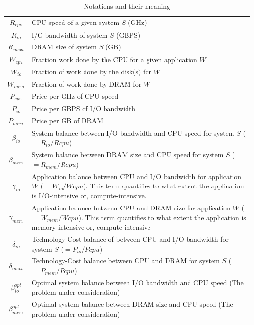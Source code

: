 \documentclass[journal]{IEEEtran}
\begin{document}
\begin{table}[!t]
\caption{Notations and their meaning}
\label{tab:Notation}
\centering
\begin{tabular}{|c|p{7cm}|}
\hline
$R_{cpu}$ & CPU speed of a given system $S$ (GHz)\\
$R_{io}$ &  I/O bandwidth of system $S$ (GBPS)\\
$R_{mem}$ & DRAM size of system $S$ (GB)\\
\hline
$W_{cpu}$ & Fraction work done by the CPU for a given application $W$\\
$W_{io}$ & Fraction of work done by the disk(s) for $W$\\
$W_{mem}$ & Fraction of work done by DRAM for $W$\\
\hline
$P_{cpu}$ & Price per GHz of CPU speed\\
$P_{io}$ & Price per GBPS of I/O bandwidth\\
$P_{mem}$ & Price per GB of DRAM\\
\hline
\hline
$\beta_{io}$ & System balance between I/O bandwidth and CPU speed for system $S$ ($= R_{io}/R{cpu}$)\\
$\beta_{mem}$ & System balance between DRAM size and CPU speed for system $S$ ($= R_{mem}/R{cpu}$)\\
\hline
$\gamma_{io}$ & Application balance between CPU and I/O bandwidth for application $W$ ($= W_{io}/W{cpu}$). This term quantifies to what extent the application is I/O-intensive or, compute-intensive. \\
$\gamma_{mem}$ & Application balance between CPU and DRAM size for application $W$ ($= W_{mem}/W{cpu}$). This term quantifies to what extent the application is memory-intensive or, compute-intensive\\
\hline
$\delta_{io}$ & Technology-Cost balance of between CPU and I/O bandwidth for system $S$ ($= P_{io}/P{cpu}$)\\
$\delta_{mem}$ & Technology-Cost balance between CPU and DRAM for system $S$ ($= P_{mem}/P{cpu}$)\\
\hline
\hline
$\beta_{io}^{opt}$ & Optimal system balance between I/O bandwidth and CPU speed (The problem under consideration)\\
$\beta_{mem}^{opt}$ & Optimal system balance between DRAM size and CPU speed (The problem under consideration)\\
\hline
\end{tabular}
\end{table}
\end{document}
